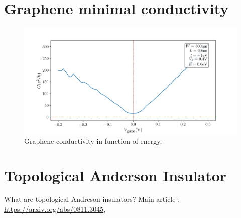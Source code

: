 \documentclass[12pt]{article}
\numberwithin{equation}{section}
\begin{document}
\newpage
\section*{Graphene minimal conductivity}
\begin{figure}[h!]
    \begin{center}
        \includegraphics[height=0.7\textheight]{./media/graphene_minimal_vg_l_0-3.png}
        \caption{Graphene conductivity in function of energy.}
        \label{fig:graphene_minimal_vg_l_0-3.png}
    \end{center}
\end{figure}

\newpage
\section*{Topological Anderson Insulator}
What are topological Andreson insulators?
Main article \cite{andersoninsulator}: \url{https://arxiv.org/abs/0811.3045},
\end{document}
